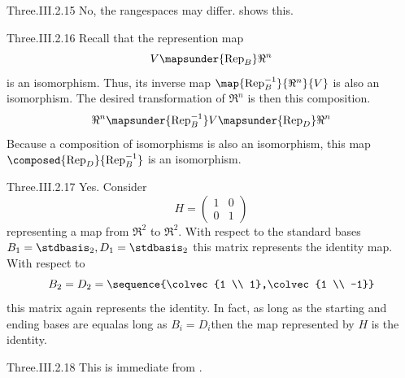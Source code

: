 \begin{ans}{Three.III.2.15}
      No, the rangespaces may differ.
       shows this.
    
\end{ans}
\begin{ans}{Three.III.2.16}
      Recall that the represention map
      \begin{equation*}
        V\mapsunder{\text{Rep}_{B}}\Re^n
      \end{equation*}
      is an isomorphism.
      Thus, its inverse map $\map{\mbox{Rep}_B^{-1}}{\Re^n}{V}$
      is also an isomorphism.
      The desired transformation of $\Re^n$ is then this composition.
      \begin{equation*}
        \Re^n\mapsunder{\text{Rep}_{B}^{-1}}
        V\mapsunder{\text{Rep}_{D}}\Re^n
      \end{equation*}
      Because a composition of isomorphisms is also an isomorphism,
      this map $\composed{\mbox{Rep}_{D}}{\mbox{Rep}_{B}^{-1}}$
      is an isomorphism.
    
\end{ans}
\begin{ans}{Three.III.2.17}
      Yes.
      Consider
      \begin{equation*}
        H=\begin{pmatrix}
            1  &0  \\
            0  &1
          \end{pmatrix}
      \end{equation*}
      representing a map from \( \Re^2 \) to \( \Re^2 \).
      With respect to the standard bases
      \( B_1=\stdbasis_2, D_1=\stdbasis_2 \) this matrix
      represents the identity map.
      With respect to
      \begin{equation*}
        B_2=D_2=\sequence{\colvec{1 \\ 1},\colvec{1 \\ -1}}
      \end{equation*}
      this matrix again represents the identity.
      In fact, as long as the starting and ending bases
      are equal\Dash as long as
      \( B_i=D_i \)\Dash then the map represented by $H$ is the identity.
    
\end{ans}
\begin{ans}{Three.III.2.18}
      This is immediate from .
    
\end{ans}
